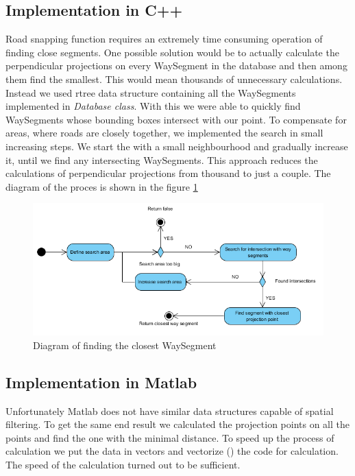 \subsection{Implementation in C++}
Road snapping function requires an extremely time consuming operation of finding close segments. One possible solution would be to actually calculate the perpendicular projections on every WaySegment in the database and then among them find the smallest. This would mean thousands of unnecessary calculations. Instead we used rtree data structure containing all the WaySegments implemented in \textit{Database class}. With this we were able to quickly find WaySegments whose bounding boxes intersect with our point. To compensate for areas, where roads are closely together, we implemented the search in small increasing steps. We start the with a small neighbourhood and gradually increase it, until we find any intersecting WaySegments. This approach reduces the calculations of perpendicular projections from thousand to just a couple. The diagram of the proces is shown in the figure \ref{fig:closestWaySegment}

\begin{figure}[h]
\centering
\includegraphics[width=0.7\linewidth]{../pictures/act_diagram_closest_way.png}
\caption{Diagram of finding the closest WaySegment}
\label{fig:closestWaySegment}
\end{figure}

\subsection{Implementation in Matlab}
Unfortunately Matlab does not have similar data structures capable of spatial filtering. To get the same end result we calculated the projection points on all the points and find the one with the minimal distance. To speed up the process of calculation we put the data in vectors and vectorize (\cite{matlab1}) the code for calculation. The speed of the calculation turned out to be sufficient.

